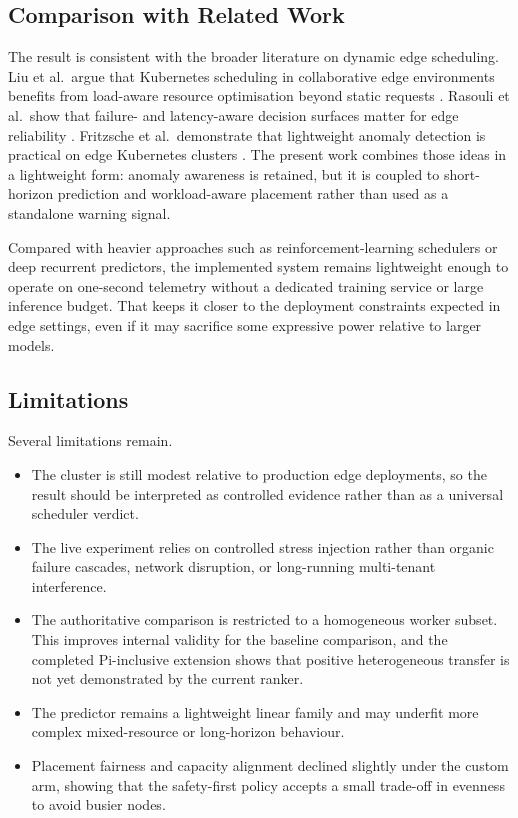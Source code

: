 \subsection{Comparison with Related Work}

The result is consistent with the broader literature on dynamic edge scheduling. Liu et al.~argue that Kubernetes scheduling in collaborative edge environments benefits from load-aware resource optimisation beyond static requests \cite{liu2024dynamic}. Rasouli et al.~show that failure- and latency-aware decision surfaces matter for edge reliability \cite{rasouli2025false}. Fritzsche et al.~demonstrate that lightweight anomaly detection is practical on edge Kubernetes clusters \cite{fritzsche2024lightweight}. The present work combines those ideas in a lightweight form: anomaly awareness is retained, but it is coupled to short-horizon prediction and workload-aware placement rather than used as a standalone warning signal.

Compared with heavier approaches such as reinforcement-learning schedulers or deep recurrent predictors, the implemented system remains lightweight enough to operate on one-second telemetry without a dedicated training service or large inference budget. That keeps it closer to the deployment constraints expected in edge settings, even if it may sacrifice some expressive power relative to larger models.


\subsection{Limitations}
\label{sec:limitations}

Several limitations remain.

\begin{itemize}
\item The cluster is still modest relative to production edge deployments, so the result should be interpreted as controlled evidence rather than as a universal scheduler verdict.
\item The live experiment relies on controlled stress injection rather than organic failure cascades, network disruption, or long-running multi-tenant interference.
\item The authoritative comparison is restricted to a homogeneous worker subset. This improves internal validity for the baseline comparison, and the completed Pi-inclusive extension shows that positive heterogeneous transfer is not yet demonstrated by the current ranker.
\item The predictor remains a lightweight linear family and may underfit more complex mixed-resource or long-horizon behaviour.
\item Placement fairness and capacity alignment declined slightly under the custom arm, showing that the safety-first policy accepts a small trade-off in evenness to avoid busier nodes.
\end{itemize}


